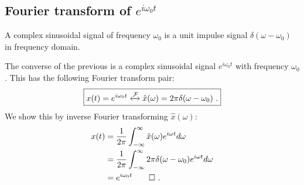\subsection{Fourier transform of $e^{i\omega_0 t}$}


\begin{marginfigure}
    \begin{center}


    \end{center}
    \caption{A complex sinusoidal signal of frequency $\omega_0$ is a unit impulse signal $\delta(\omega-\omega_0)$ in frequency domain.}
\end{marginfigure}

The converse of the previous is a complex sinusoidal signal $e^{i\omega_0 t}$ with 
frequency $\omega_0$. This has the following Fourier transform pair:
\begin{equation}
    \boxed{
        x(t) = e^{i\omega_0 t} \xleftrightarrow{\mathcal{F}} \hat{x}(\omega) = 2\pi \delta(\omega-\omega_0)\,\,.
    }
\end{equation}
We show this by inverse Fourier transforming $\hat{x}(\omega)$:
\begin{align}
    x(t) & = \frac{1}{2\pi}\int_{-\infty}^{\infty} \hat{x}(\omega) e^{i\omega t} d\omega             \\
         & = \frac{1}{2\pi}\int_{-\infty}^{\infty} 2\pi \delta(\omega-\omega_0)e^{i\omega t} d\omega \\
         & = e^{i\omega_0 t}\qed\,\,.
\end{align}

